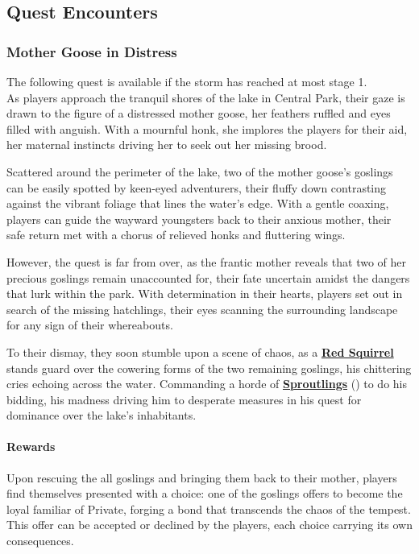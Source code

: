 \subsection*{Quest Encounters}
\subsubsection*{Mother Goose in Distress}
The following quest is available if the storm has reached at most stage 1.\\
As players approach the tranquil shores of the lake in Central Park, their gaze is drawn to the figure of a distressed mother goose, her feathers ruffled and eyes filled with anguish. With a mournful honk, she implores the players for their aid, her maternal instincts driving her to seek out her missing brood.

Scattered around the perimeter of the lake, two of the mother goose's goslings can be easily spotted by keen-eyed adventurers, their fluffy down contrasting against the vibrant foliage that lines the water's edge. With a gentle coaxing, players can guide the wayward youngsters back to their anxious mother, their safe return met with a chorus of relieved honks and fluttering wings.

However, the quest is far from over, as the frantic mother reveals that two of her precious goslings remain unaccounted for, their fate uncertain amidst the dangers that lurk within the park. With determination in their hearts, players set out in search of the missing hatchlings, their eyes scanning the surrounding landscape for any sign of their whereabouts.

To their dismay, they soon stumble upon a scene of chaos, as a \hyperref[sec:RedSquirrel]{\textbf{Red Squirrel}} stands guard over the cowering forms of the two remaining goslings, his chittering cries echoing across the water. Commanding a horde of \hyperref[sec:Sproutling]{\textbf{Sproutlings}} () to do his bidding, his madness driving him to desperate measures in his quest for dominance over the lake's inhabitants.

\paragraph*{Rewards}
Upon rescuing the all goslings and bringing them back to their mother, players find themselves presented with a choice: one of the goslings offers to become the loyal familiar of Private, forging a bond that transcends the chaos of the tempest. This offer can be accepted or declined by the players, each choice carrying its own consequences.

